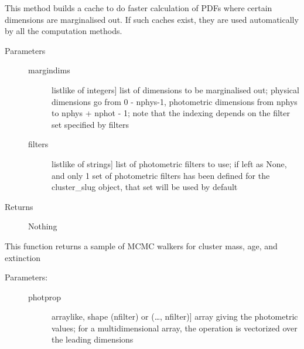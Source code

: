 \documentclass[letterpaper,10pt,english]{sphinxmanual}
\begin{document}
\begin{fulllineitems}
\begin{fulllineitems}
\begin{description}
\end{description}

\end{fulllineitems}


\begin{fulllineitems}
\label{\detokenize{cluster_slug:slugpy.cluster_slug.cluster_slug.make_cache}}
This method builds a cache to do faster calculation of PDFs
where certain dimensions are marginalised out. If such caches
exist, they are used automatically by all the computation
methods.
\begin{description}
\item[{Parameters}] \leavevmode\begin{description}
\item[{margindims}] \leavevmode{[}listlike of integers{]}
list of dimensions to be marginalised out; physical
dimensions go from 0 - nphys-1, photometric dimensions
from nphys to nphys + nphot - 1; note that the indexing
depends on the filter set specified by filters

\item[{filters}] \leavevmode{[}listlike of strings{]}
list of photometric filters to use; if left as None, and
only 1 set of photometric filters has been defined for
the cluster\_slug object, that set will be used by
default

\end{description}

\item[{Returns}] \leavevmode
Nothing

\end{description}

\end{fulllineitems}


\begin{fulllineitems}
\label{\detokenize{cluster_slug:slugpy.cluster_slug.cluster_slug.mcmc}}
This function returns a sample of MCMC walkers for cluster
mass, age, and extinction
\begin{description}
\item[{Parameters:}] \leavevmode\begin{description}
\item[{photprop}] \leavevmode{[}arraylike, shape (nfilter) or (…, nfilter){]}
array giving the photometric values; for a
multidimensional array, the operation is vectorized over
the leading dimensions


\end{description}
\end{description}
\end{fulllineitems}
\end{fulllineitems}
\end{document}
